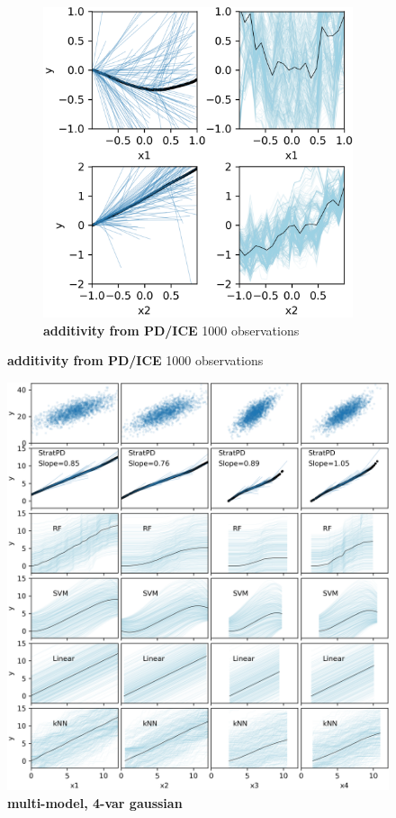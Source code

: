 \documentclass[12pt]{article}
\begin{document}
\begin{figure}[htbp]
\begin{subfigure}[h]{0.495\textwidth}
\includegraphics[scale=0.7]{images/additivity.png}
\caption{{\bf additivity from PD/ICE} 1000 observations}
\label{fig:additivity_stratpd}
\end{subfigure}
\end{figure}

\begin{figure}[htbp]
\begin{center}
\includegraphics[scale=0.6]{images/multivar_multimodel_normal.png}
\caption{{\bf  multi-model, 4-var gaussian}}
\label{fig:4var}
\end{center}
\end{figure}
\end{document}
